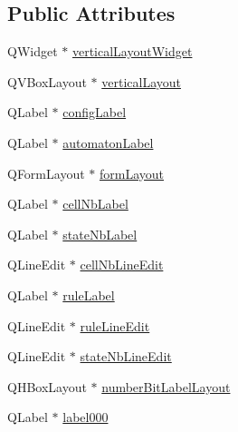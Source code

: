 \subsection*{Public Attributes}
\begin{DoxyCompactItemize}
\item 
Q\+Widget $\ast$ \mbox{\hyperlink{class_ui___config_elementary_automaton_window_a4fe6b0bfc2b0a23557b09fbe62d473d1}{vertical\+Layout\+Widget}}
\item 
Q\+V\+Box\+Layout $\ast$ \mbox{\hyperlink{class_ui___config_elementary_automaton_window_afb259137d8ef832bf8bd58bc913ef4a8}{vertical\+Layout}}
\item 
Q\+Label $\ast$ \mbox{\hyperlink{class_ui___config_elementary_automaton_window_a4a59f6203dd3e958129af9652e840135}{config\+Label}}
\item 
Q\+Label $\ast$ \mbox{\hyperlink{class_ui___config_elementary_automaton_window_aea61d127cc43fb3ee0db6d8f18ad50d7}{automaton\+Label}}
\item 
Q\+Form\+Layout $\ast$ \mbox{\hyperlink{class_ui___config_elementary_automaton_window_af9856077b75e779c11bb5fdd10192dd9}{form\+Layout}}
\item 
Q\+Label $\ast$ \mbox{\hyperlink{class_ui___config_elementary_automaton_window_a6b802da535aea898708ced70f32d6f4d}{cell\+Nb\+Label}}
\item 
Q\+Label $\ast$ \mbox{\hyperlink{class_ui___config_elementary_automaton_window_a35bd56458adc2d51f3340bd854b0bc4d}{state\+Nb\+Label}}
\item 
Q\+Line\+Edit $\ast$ \mbox{\hyperlink{class_ui___config_elementary_automaton_window_ac9b7084dd84832aacb6277a47b749336}{cell\+Nb\+Line\+Edit}}
\item 
Q\+Label $\ast$ \mbox{\hyperlink{class_ui___config_elementary_automaton_window_a5807f473f760943d39b300c94482e62f}{rule\+Label}}
\item 
Q\+Line\+Edit $\ast$ \mbox{\hyperlink{class_ui___config_elementary_automaton_window_a0ddae2d885c2829b65bfaa3b65d5ea9d}{rule\+Line\+Edit}}
\item 
Q\+Line\+Edit $\ast$ \mbox{\hyperlink{class_ui___config_elementary_automaton_window_ae7c9bd9a91221972f54a57374e4633f8}{state\+Nb\+Line\+Edit}}
\item 
Q\+H\+Box\+Layout $\ast$ \mbox{\hyperlink{class_ui___config_elementary_automaton_window_a7835c707325b3fbf2be2c9f2848c9438}{number\+Bit\+Label\+Layout}}
\item 
Q\+Label $\ast$ \mbox{\hyperlink{class_ui___config_elementary_automaton_window_a5c542340dd33eb9fa9743689e34416a3}{label000}}

\end{DoxyCompactItemize}
